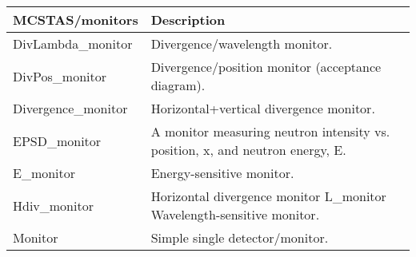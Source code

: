 \begin{table}
  \begin{center}
    {\let\my=\\
    \begin{tabular}{|p{}|p{}|}
      \hline
       {\bf MCSTAS/monitors} & Description \\
       \hline
DivLambda\_monitor &  Divergence/wavelength monitor. \\
DivPos\_monitor  &    Divergence/position
                    monitor (acceptance
                    diagram). \\
Divergence\_monitor &  Horizontal+vertical
                    divergence monitor. \\
EPSD\_monitor    &    A monitor measuring neutron
                    intensity vs. position, x,
                    and neutron energy, E. \\
E\_monitor       &    Energy-sensitive monitor. \\
Hdiv\_monitor    &    Horizontal divergence monitor
L\_monitor           Wavelength-sensitive monitor. \\
Monitor          &   Simple
                    single detector/monitor. \\


\end{tabular}}
\end{center}
\end{table}
